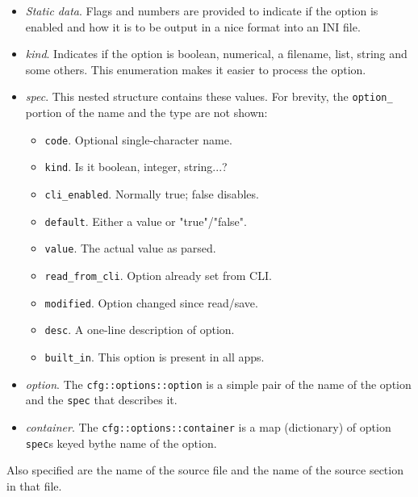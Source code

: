    \begin{itemize}
      \item \textsl{Static data}.
         Flags and numbers are provided to indicate if the option is enabled
         and how it is to be output in a nice format into an INI file.
      \item \textsl{kind}.
         Indicates if the option is boolean, numerical, a filename, list,
         string and some others. This enumeration makes it easier to
         process the option.
      \item \textsl{spec}.
         This nested structure contains these values. For brevity, the
         \texttt{option\_} portion of the name and the type are not shown:
         \begin{itemize}
            \item \texttt{code}.
               Optional single-character name.
            \item \texttt{kind}.
               Is it boolean, integer, string...?
            \item \texttt{cli\_enabled}.
               Normally true; false disables.
            \item \texttt{default}.
               Either a value or "true"/"false".
            \item \texttt{value}.
               The actual value as parsed.
            \item \texttt{read\_from\_cli}.
               Option already set from CLI.
            \item \texttt{modified}.
               Option changed since read/save.
            \item \texttt{desc}.
               A one-line description of option.
            \item \texttt{built\_in}.
               This option is present in all apps.
         \end{itemize}
      \item \textsl{option}.
         The \texttt{cfg::options::option} is a simple pair of the
         name of the option and the \texttt{spec} that describes it.
      \item \textsl{container}.
         The \texttt{cfg::options::container} is a map (dictionary) of
         option \texttt{spec}s keyed bythe name of the option.
   \end{itemize}

   Also specified are the name of the source file and the name of the
   source section in that file.

